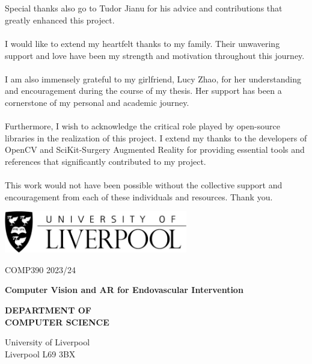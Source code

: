 \documentclass[12pt]{article}
\begin{document}
\\\\
Special thanks also go to Tudor Jianu for his advice and contributions that greatly enhanced this project.
\\\\
I would like to extend my heartfelt thanks to my family. Their unwavering support and love have been my strength and motivation throughout this journey.
\\\\
I am also immensely grateful to my girlfriend, Lucy Zhao, for her understanding and encouragement during the course of my thesis. Her support has been a cornerstone of my personal and academic journey.
\\\\
Furthermore, I wish to acknowledge the critical role played by open-source libraries in the realization of this project. I extend my thanks to the developers of OpenCV\cite{opencv_library} and SciKit-Surgery Augmented Reality\cite{Thompson_SciKit-Surgery_Compact_Libraries_2020} for providing essential tools and references that significantly contributed to my project.
\\\\
This work would not have been possible without the collective support and encouragement from each of these individuals and resources. Thank you.
\newpage
\begin{titlepage}
      \centering


      \includegraphics[width=0.6\textwidth]{Liverpool.jpg} %
      \vspace*{1cm}

      \Large
      COMP390
      \large
      2023/24

      \vspace{4.5cm}
      \Huge
      \textbf{Computer Vision and AR for Endovascular Intervention}

      \vspace{1.5cm}



      \vspace{4cm} %
      \Large
      \textbf{DEPARTMENT OF}\\
      \vspace{0.1cm} %
      \textbf{COMPUTER SCIENCE}

      \vspace{1cm} %
      \large
      University of Liverpool\\
      Liverpool L69 3BX

\end{titlepage}
\tableofcontents
\newpage
\end{document}
